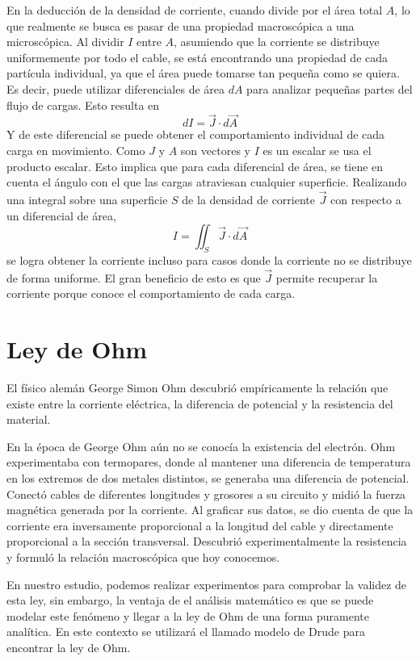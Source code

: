 En la deducción de la densidad de corriente, cuando divide por el área total \(A\), lo que realmente se busca es pasar de una propiedad macroscópica a una microscópica. Al dividir \(I\) entre \(A\), asumiendo que la corriente se distribuye uniformemente por todo el cable, se está encontrando una propiedad de cada partícula individual, ya que el área puede tomarse tan pequeña como se quiera. Es decir, puede utilizar diferenciales de área \(dA\) para analizar pequeñas partes del flujo de cargas. Esto resulta en 
\[
  dI = \vec{J}\cdot d\vec{A}
\]
Y de este diferencial se puede obtener el comportamiento individual de cada carga en movimiento. Como \(J\) y \(A\) son vectores y \(I\) es un escalar se usa el producto escalar. Esto implica que para cada diferencial de área, se tiene en cuenta el ángulo con el que las cargas atraviesan cualquier superficie. Realizando una integral sobre una superficie \(S\) de la densidad de corriente \(\vec{J}\) con respecto a un diferencial de área,
\[
  I = \iint_S \vec{J}\cdot d\vec{A}
\]
se logra obtener la corriente incluso para casos donde la corriente no se distribuye de forma uniforme. El gran beneficio de esto es que \(\vec{J}\) permite recuperar la corriente porque conoce el comportamiento de cada carga.

\section{Ley de Ohm}

El físico alemán George Simon Ohm descubrió empíricamente la relación que existe entre la corriente eléctrica, la diferencia de potencial y la resistencia del material. 

En la época de George Ohm aún no se conocía la existencia del electrón. Ohm experimentaba con termopares, donde al mantener una diferencia de temperatura en los extremos de dos metales distintos, se generaba una diferencia de potencial. Conectó cables de diferentes longitudes y grosores a su circuito y midió la fuerza magnética generada por la corriente. Al graficar sus datos, se dio cuenta de que la corriente era inversamente proporcional a la longitud del cable y directamente proporcional a la sección transversal. Descubrió experimentalmente la resistencia y formuló la relación macroscópica que hoy conocemos.

En nuestro estudio, podemos realizar experimentos para comprobar la validez de esta ley, sin embargo, la ventaja de el análisis matemático es que se puede modelar este fenómeno y llegar a la ley de Ohm de una forma puramente analítica. En este contexto se utilizará el llamado modelo de Drude para encontrar la ley de Ohm.

